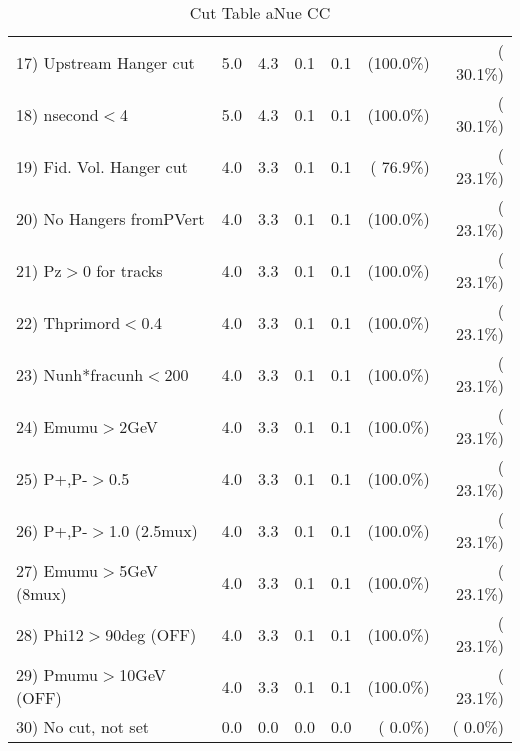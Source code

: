 \begin{table}[h!]
\begin{tabular}{||l||r|r|r|r|r|r||}
 17) Upstream Hanger cut  &          5.0 &          4.3 &          0.1 &          0.1 & (100.0\%) & ( 30.1\%) \\
 18) nsecond$<$4          &          5.0 &          4.3 &          0.1 &          0.1 & (100.0\%) & ( 30.1\%) \\
 19) Fid. Vol. Hanger cut &          4.0 &          3.3 &          0.1 &          0.1 & ( 76.9\%) & ( 23.1\%) \\
 20) No Hangers fromPVert &          4.0 &          3.3 &          0.1 &          0.1 & (100.0\%) & ( 23.1\%) \\
 21) Pz$>$0 for tracks    &          4.0 &          3.3 &          0.1 &          0.1 & (100.0\%) & ( 23.1\%) \\
 22) Thprimord$<$0.4      &          4.0 &          3.3 &          0.1 &          0.1 & (100.0\%) & ( 23.1\%) \\
 23) Nunh*fracunh$<$200   &          4.0 &          3.3 &          0.1 &          0.1 & (100.0\%) & ( 23.1\%) \\
 24) Emumu$>$2GeV         &          4.0 &          3.3 &          0.1 &          0.1 & (100.0\%) & ( 23.1\%) \\
 25) P+,P-$>$0.5          &          4.0 &          3.3 &          0.1 &          0.1 & (100.0\%) & ( 23.1\%) \\
 26) P+,P-$>$1.0 (2.5mux) &          4.0 &          3.3 &          0.1 &          0.1 & (100.0\%) & ( 23.1\%) \\
 27) Emumu$>$5GeV  (8mux) &          4.0 &          3.3 &          0.1 &          0.1 & (100.0\%) & ( 23.1\%) \\
 28) Phi12$>$90deg  (OFF) &          4.0 &          3.3 &          0.1 &          0.1 & (100.0\%) & ( 23.1\%) \\
 29) Pmumu$>$10GeV  (OFF) &          4.0 &          3.3 &          0.1 &          0.1 & (100.0\%) & ( 23.1\%) \\
 30) No cut, not set      &          0.0 &          0.0 &          0.0 &          0.0 & (  0.0\%) & (  0.0\%) \\
 \hline
 \hline
 \end{tabular}
 \caption{Cut Table  aNue CC  }
 \label{tab-cutheavy_neutrino_3.000}
 \end{table}
